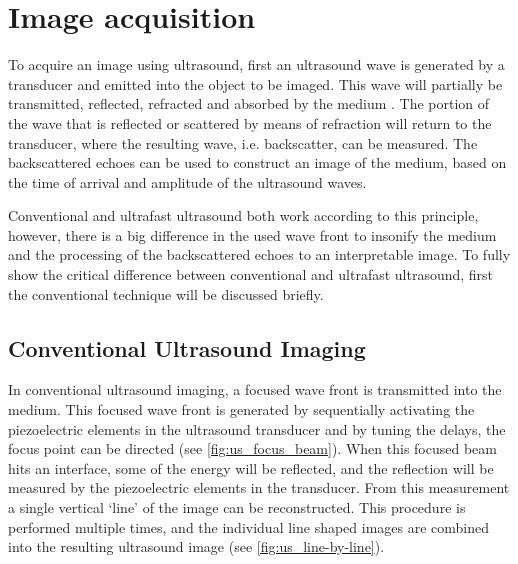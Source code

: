 \section{Image acquisition}
To acquire an image using ultrasound, first an ultrasound wave is generated by a transducer and emitted into the object to be imaged. This wave will partially be transmitted, reflected, refracted and absorbed by the medium \cite{pillen_ultrasonography_2013}. The portion of the wave that is reflected or scattered by means of refraction will return to the transducer, where the resulting wave, i.e. backscatter, can be measured. The backscattered echoes can be used to construct an image of the medium, based on the time of arrival and amplitude of the ultrasound waves. 

Conventional and ultrafast ultrasound both work according to this principle, however, there is a big difference in the used wave front to insonify the medium and the processing of the backscattered echoes to an interpretable image. To fully show the critical difference between conventional and ultrafast ultrasound, first the conventional technique will be discussed briefly. 



\subsection{Conventional Ultrasound Imaging}
\label{sec:conv_us}
In conventional ultrasound imaging, a focused wave front is transmitted into the medium. This focused wave front is generated by sequentially activating the piezoelectric elements in the ultrasound transducer and by tuning the delays, the focus point can be directed (see \autoref{fig:us_focus_beam}). When this focused beam hits an interface, some of the energy will be reflected, and the reflection will be measured by the piezoelectric elements in the transducer. From this measurement a single vertical `line' of the image can be reconstructed. This procedure is performed multiple times, and the individual line shaped images are combined into the resulting ultrasound image (see \autoref{fig:us_line-by-line}). 


